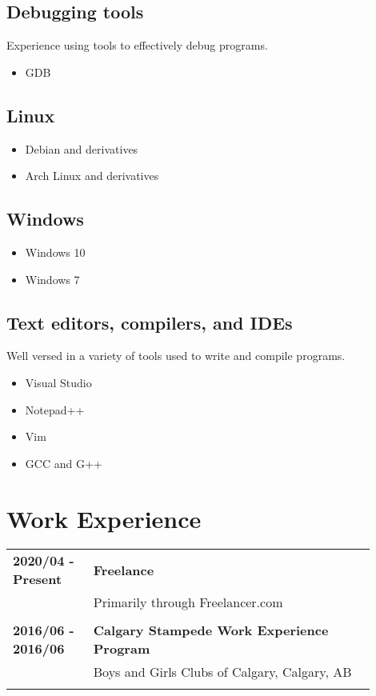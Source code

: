 \documentclass[letterpaper]{article}
\begin{document}
        \subsection*{Debugging tools}
        Experience using tools to effectively debug programs.

        \begin{itemize}
            \item GDB
        \end{itemize}

        \subsection*{Linux}

        \begin{itemize}
            \item Debian and derivatives
            \item Arch Linux and derivatives
        \end{itemize}

        \subsection*{Windows}

        \begin{itemize}
            \item Windows 10
            \item Windows 7
        \end{itemize}

        \subsection*{Text editors, compilers, and IDEs}
        Well versed in a variety of tools used to write and compile programs.

        \begin{itemize}
            \item Visual Studio
            \item Notepad++
            \item Vim
            \item GCC and G++
        \end{itemize}

    \section*{Work Experience}
        \begin{tabular}{p{0.2\linewidth}p{0.7\linewidth}} 
            \textbf{2020/04 - Present} & \large\textbf{Freelance} \\
            & Primarily through Freelancer.com \\
            \\
            \textbf{2016/06 - 2016/06} & \large\textbf{Calgary Stampede Work Experience Program} \\
            & Boys and Girls Clubs of Calgary, Calgary, AB \\
            \\
        \end{tabular}
\end{document}
